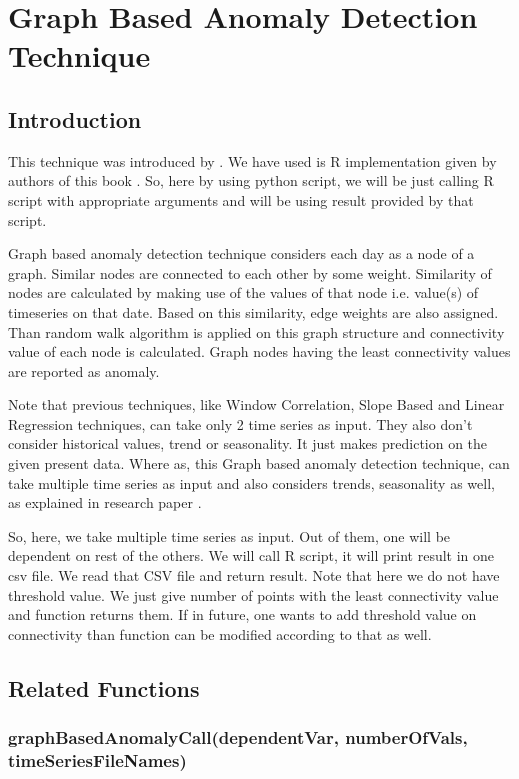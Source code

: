 \chapter{Graph Based Anomaly Detection Technique}

\section{Introduction}

This technique was introduced by \cite{nasa}. We have used is R implementation given by 
authors of this book \cite{nasarbook}. So, here by using python script, we will be just 
calling R script with appropriate arguments and will be using result provided 
by that script.

Graph based anomaly detection technique considers each day as a  node of a 
graph. Similar nodes are connected to each other by some weight. Similarity of 
nodes are calculated by making use of the values of that node i.e. value(s) of 
timeseries on that date. Based on this similarity, edge weights are also 
assigned. Than random walk algorithm is applied on this graph structure and 
connectivity value of each node is calculated. Graph nodes having the least 
connectivity values are reported as anomaly.

Note that previous techniques, like Window 
Correlation, Slope Based and Linear Regression techniques, can take only 2 time 
series as input. They also don't consider historical values, trend or 
seasonality. It just makes prediction on the given present data. Where as, this 
Graph based anomaly detection technique, can take multiple time series as input 
and also considers trends, seasonality as well, as explained in research paper 
\cite{nasa}.

So, here, we take multiple time series as input. Out of them, one will be 
dependent on rest of the others. We will call R script, it will print result in 
one csv file. We read that CSV file and return result. Note that here we do not 
have threshold value. We just give number of points with the least connectivity 
value and function returns them. If in future, one wants to add threshold value 
on connectivity than function can be modified according to that as well.

\section{Related Functions}

\subsection{graphBasedAnomalyCall(dependentVar, numberOfVals, 
timeSeriesFileNames)}

